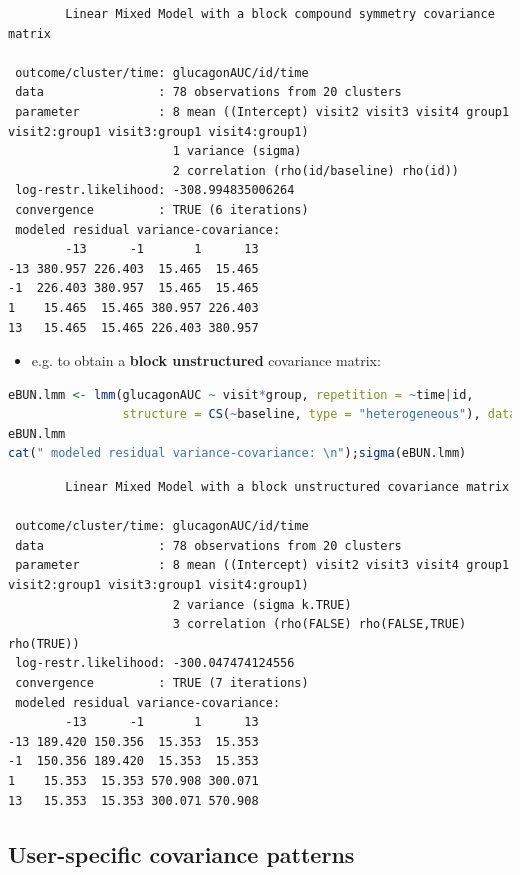 \documentclass[12pt]{article}
\begin{document}
\label{}
\begin{verbatim}
		Linear Mixed Model with a block compound symmetry covariance matrix 

 outcome/cluster/time: glucagonAUC/id/time 
 data                : 78 observations from 20 clusters 
 parameter           : 8 mean ((Intercept) visit2 visit3 visit4 group1 visit2:group1 visit3:group1 visit4:group1) 
                       1 variance (sigma) 
                       2 correlation (rho(id/baseline) rho(id)) 
 log-restr.likelihood: -308.994835006264 
 convergence         : TRUE (6 iterations)
 modeled residual variance-covariance: 
        -13      -1       1      13
-13 380.957 226.403  15.465  15.465
-1  226.403 380.957  15.465  15.465
1    15.465  15.465 380.957 226.403
13   15.465  15.465 226.403 380.957
\end{verbatim}

\begin{itemize}
\item e.g. to obtain a \textbf{block unstructured} covariance matrix:
\end{itemize}
\begin{lstlisting}[language=r,numbers=none]
eBUN.lmm <- lmm(glucagonAUC ~ visit*group, repetition = ~time|id,
                structure = CS(~baseline, type = "heterogeneous"), data = gastricbypassL)
eBUN.lmm
cat(" modeled residual variance-covariance: \n");sigma(eBUN.lmm)
\end{lstlisting}

\label{}
\begin{verbatim}
		Linear Mixed Model with a block unstructured covariance matrix 

 outcome/cluster/time: glucagonAUC/id/time 
 data                : 78 observations from 20 clusters 
 parameter           : 8 mean ((Intercept) visit2 visit3 visit4 group1 visit2:group1 visit3:group1 visit4:group1) 
                       2 variance (sigma k.TRUE) 
                       3 correlation (rho(FALSE) rho(FALSE,TRUE) rho(TRUE)) 
 log-restr.likelihood: -300.047474124556 
 convergence         : TRUE (7 iterations)
 modeled residual variance-covariance: 
        -13      -1       1      13
-13 189.420 150.356  15.353  15.353
-1  150.356 189.420  15.353  15.353
1    15.353  15.353 570.908 300.071
13   15.353  15.353 300.071 570.908
\end{verbatim}

\clearpage
\subsection{User-specific covariance patterns}
\label{sec:org68491cc}
\end{document}
